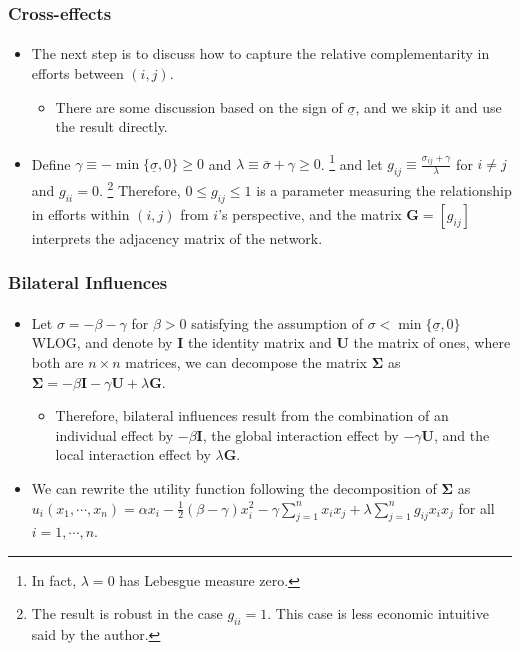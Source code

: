 \documentclass{beamer}
\newcommand{\hl}[1]{\textcolor{myblue}{#1}}
\newcommand{\lb}[1]{\underline{#1}}
\newcommand{\sij}{\sigma_{ij}}
\newcommand{\gij}{g_{ij}}
\newcommand{\lbs}{\lb{\sigma}}
\newcommand{\ubs}{\bar{\sigma}}
\begin{document}
\begin{frame}%
    \frametitle{Cross-effects}
    \framesubtitle{}
    \begin{itemize}
        \item The next step is to discuss how to capture the relative complementarity in efforts
            between $(i,j)$.
            \begin{itemize}
                \item There are some discussion based on the sign of $\lbs$, and we skip it and use the
                    result directly.
            \end{itemize}
        \item Define $\gamma\equiv-\min\{\lbs,0\}\geq0$ and $\lambda\equiv\ubs+\gamma\geq0$.
            \footnote{In fact, $\lambda=0$ has Lebesgue measure zero.} and let
            $\gij\equiv\frac{\sij+\gamma}{\lambda}$ for $i\neq j$ and $g_{ii}=0$.
            \footnote{The result is robust in the case $g_{ii}=1$. This case is less
            economic intuitive said by the author.} Therefore,
            \hl{$0\leq \gij\leq1$ is a parameter measuring the relationship in efforts within $(i,j)$
            from $i$'s perspective, and the matrix $\bm{G}=[\gij]$ interprets the adjacency
            matrix of the network.}
    \end{itemize}
\end{frame}

\begin{frame}%
    \frametitle{Bilateral Influences}
    \framesubtitle{}
    \begin{itemize}
        \item Let $\sigma=-\beta-\gamma$ for $\beta>0$ 
            satisfying the assumption of $\sigma<\min\{\lbs,0\}$ WLOG, and
            denote by $\bm{I}$ the identity matrix and $\bm{U}$ the matrix of ones, 
            where both are $n\times n$ matrices, we can decompose the matrix $\bm{\Sigma}$ as
            \hl{$\bm{\Sigma}=-\beta\bm{I}-\gamma\bm{U}+\lambda\bm{G}$}.
            \begin{itemize}
                \item Therefore, bilateral influences result from
                    the combination of \hl{an individual effect by $-\beta\bm{I}$,
                    the global interaction effect by $-\gamma\bm{U}$, and the local
                    interaction effect by $\lambda\bm{G}$}.
            \end{itemize}
        \item We can rewrite the utility function following the decomposition of $\bm{\Sigma}$ as
            $u_i(x_1,\cdots,x_n)=\alpha x_i-\frac{1}{2}(\beta-\gamma)x_i^2
            -\gamma\sum_{j=1}^nx_ix_j+\lambda\sum_{j=1}^n\gij x_ix_j$ for all $i=1,\cdots,n$.
    \end{itemize}
\end{frame}
\end{document}
